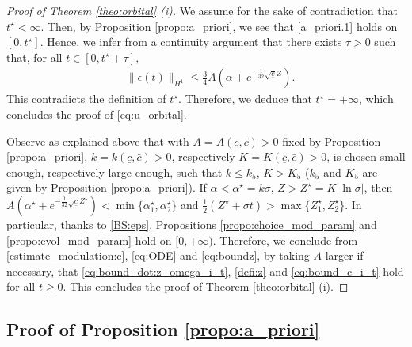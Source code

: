\documentclass[reqno,10pt]{amsart}
\numberwithin{equation}{section}
\begin{document}
\begin{proof}[Proof of Theorem \ref{theo:orbital} (i)] We assume for the sake of contradiction that $t^{\star} < \infty$. Then, by Proposition \ref{propo:a_priori}, we see that \eqref{a_priori.1} holds on $[0,t^{\star}]$. Hence, we infer from a continuity argument that there exists $\tau>0$ such that, for all $t \in [0,t^{\star}+\tau],$
\begin{align*} 
&\|\epsilon(t)\|_{H^1} \leq \frac34 A \left( \alpha + e^{-\frac{1}{32} \sqrt{\underline{c}}Z }  \right) . %
\end{align*}
This contradicts the definition of $t^{\star}$. Therefore, we deduce that $t^{\star}=+\infty$, which concludes the proof of \eqref{eq:u_orbital}. 

Observe as explained above that with $A=A(\underline{c},\bar{c})>0$ fixed by Proposition \ref{propo:a_priori}, $k=k(\underline{c},\bar{c})>0$, respectively $K=K(\underline{c},\bar{c})>0$, is chosen small enough, respectively large enough, such that $k \le k_5$, $K>K_5$ ($k_5$ and $K_5$ are given by Proposition \ref{propo:a_priori}). If $\alpha<\alpha^{\star}=k\sigma$, $Z>Z^{\star}=K|\ln \sigma|$, then $A \left( \alpha^{\star} + e^{-\frac{1}{32} \sqrt{\underline{c}}Z^{\star} }  \right)< \min\{\alpha_1^{\star},\alpha_2^{\star}\}$ and $\frac12 (Z^{\star}+\sigma t)>\max\{Z_1^{\star},Z_2^{\star}\}$. In particular, thanks to \eqref{BS:eps}, Propositions \ref{propo:choice_mod_param} and \ref{propo:evol_mod_param} hold on $[0,+\infty)$. Therefore, we conclude from \eqref{estimate_modulation:c}, \eqref{eq:ODE} and \eqref{eq:boundz}, by taking $A$ larger if necessary, that \eqref{eq:bound_dot:z_omega_i_t}, \eqref{defi:z} and \eqref{eq:bound_c_i_t} hold for all $t \ge 0$. This concludes the proof of Theorem \ref{theo:orbital} (i). 
\end{proof}


	

 \subsection{Proof of Proposition \ref{propo:a_priori}}
\end{document}
